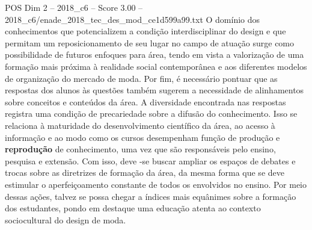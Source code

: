 \begin{textsample}{POS Dim 2 – 2018\_c6 – Score 3.00 – 2018\_c6/enade\_2018\_tec\_des\_mod\_ce1d599a99.txt}
O domínio dos conhecimentos que potencializem a condição interdisciplinar do design e que permitam um reposicionamento de seu lugar no campo de atuação surge como possibilidade de futuros enfoques para área, tendo em vista a valorização de uma formação mais próxima à realidade social contemporânea e aos diferentes modelos de organização do mercado de moda.
Por fim, é necessário pontuar que as respostas dos alunos às questões também sugerem a necessidade de alinhamentos sobre conceitos e conteúdos da área.
A diversidade encontrada nas respostas registra uma condição de precariedade sobre a difusão do conhecimento.
Isso se relaciona à maturidade do desenvolvimento científico da área, ao acesso à informação e ao modo como os cursos desempenham função de produção e \textbf{reprodução} de conhecimento, uma vez que são responsáveis pelo ensino, pesquisa e extensão.
Com isso, deve -se buscar ampliar os espaços de debates e trocas sobre as diretrizes de formação da área, da mesma forma que se deve estimular o aperfeiçoamento constante de todos os envolvidos no ensino.
Por meio dessas ações, talvez se possa chegar a índices mais equânimes sobre a formação dos estudantes, pondo em destaque uma educação atenta ao contexto sociocultural do design de moda.

\end{textsample}
